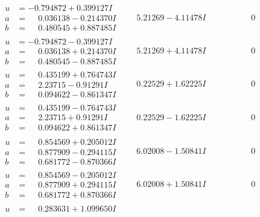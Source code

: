 \documentclass[1p]{elsarticle_modified}
\theoremstyle{definition}
\begin{document}
$$\begin{array}{c|c|c}
 \hline 
\begin{aligned}
u &= -0.794872 + 0.399127 I \\
a &= \phantom{-}0.036138 - 0.214370 I \\
b &= \phantom{-}0.480545 + 0.887485 I\end{aligned}
 & \phantom{-}5.21269 - 4.11478 I & \phantom{-0.000000 } 0 \\ \hline\begin{aligned}
u &= -0.794872 - 0.399127 I \\
a &= \phantom{-}0.036138 + 0.214370 I \\
b &= \phantom{-}0.480545 - 0.887485 I\end{aligned}
 & \phantom{-}5.21269 + 4.11478 I & \phantom{-0.000000 } 0 \\ \hline\begin{aligned}
u &= \phantom{-}0.435199 + 0.764743 I \\
a &= \phantom{-}2.23715 - 0.91291 I \\
b &= \phantom{-}0.094622 - 0.861347 I\end{aligned}
 & \phantom{-}0.22529 + 1.62225 I & \phantom{-0.000000 } 0 \\ \hline\begin{aligned}
u &= \phantom{-}0.435199 - 0.764743 I \\
a &= \phantom{-}2.23715 + 0.91291 I \\
b &= \phantom{-}0.094622 + 0.861347 I\end{aligned}
 & \phantom{-}0.22529 - 1.62225 I & \phantom{-0.000000 } 0 \\ \hline\begin{aligned}
u &= \phantom{-}0.854569 + 0.205012 I \\
a &= \phantom{-}0.877909 - 0.294115 I \\
b &= \phantom{-}0.681772 - 0.870366 I\end{aligned}
 & \phantom{-}6.02008 - 1.50841 I & \phantom{-0.000000 } 0 \\ \hline\begin{aligned}
u &= \phantom{-}0.854569 - 0.205012 I \\
a &= \phantom{-}0.877909 + 0.294115 I \\
b &= \phantom{-}0.681772 + 0.870366 I\end{aligned}
 & \phantom{-}6.02008 + 1.50841 I & \phantom{-0.000000 } 0 \\ \hline\begin{aligned}
u &= \phantom{-}0.283631 + 1.099650 I \\

\end{aligned}
\end{array}$$
\end{document}
